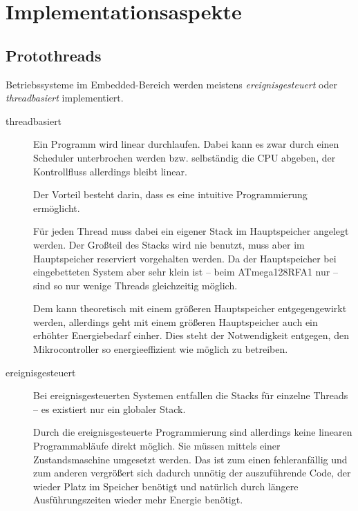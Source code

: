 \chapter{Implementationsaspekte}
\label{sec:impl}



\section{Protothreads}
	Betriebssysteme im Embedded-Bereich werden meistens
	\emph{ereignisgesteuert} oder \emph{threadbasiert} implementiert.

	\begin{description}
	\item[threadbasiert]
		Ein Programm wird linear durchlaufen.  Dabei kann es zwar durch
		einen Scheduler unterbrochen werden bzw. selbständig die CPU
		abgeben, der Kontrollfluss allerdings bleibt linear.

		Der Vorteil besteht darin, dass es eine intuitive Programmierung
		ermöglicht.

		Für jeden Thread muss dabei ein eigener Stack im Hauptspeicher
		angelegt werden.  Der Großteil des Stacks wird nie benutzt, muss
		aber im Hauptspeicher reserviert vorgehalten werden.
		Da der Hauptspeicher bei eingebetteten System aber sehr klein
		ist -- beim ATmega128RFA1 \zB nur  --
		sind so nur wenige Threads gleichzeitig möglich.

		Dem kann theoretisch mit einem größeren Hauptspeicher
		entgegengewirkt werden, allerdings geht mit einem größeren
		Hauptspeicher auch ein erhöhter Energiebedarf einher.  Dies
		steht der Notwendigkeit entgegen, den Mikrocontroller so
		energieeffizient wie möglich zu betreiben.

	\item[ereignisgesteuert]
		Bei ereignisgesteuerten Systemen entfallen die Stacks für
		einzelne Threads -- es existiert nur ein globaler Stack.

		Durch die ereignisgesteuerte Programmierung sind allerdings
		keine linearen Programmabläufe direkt möglich.  Sie müssen
		mittels einer Zustandsmaschine umgesetzt werden.  Das ist
		zum einen fehleranfällig und zum anderen vergrößert
		sich dadurch unnötig der auszuführende Code, der wieder
		Platz im Speicher benötigt und natürlich durch längere
		Ausführungszeiten wieder mehr Energie benötigt.
	\end{description}

